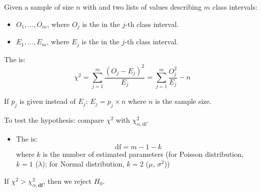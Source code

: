 \clearpage

\begin{multicols}{2}


  \par Given a sample of size $n$ with  and two lists of values describing  $m$ class intervals:
    \begin{itemize}
      \item $O_1, \ldots, O_m$, where $O_j$ is the  in the $j$-th class interval.
      \item $E_1, \ldots, E_m$, where $E_j$ is the  in the $j$-th class interval.
    \end{itemize}

  \par The  is:
    \[
      \chi^2 = \sum\limits_{j = 1}^{m} \frac{(O_j - E_j)^2}{E_j}
             = \sum\limits_{j = 1}^{m} \frac{O_j^2}{E_j} - n
    \]
  
  \par If $p_j$ is given instead of $E_j$: $E_j = p_j \times n$ where $n$ is the sample size.

  \par To test the hypothesis: compare $\chi^2$ with $\chi^2_{\alpha, \text{df}}$.
    \begin{itemize}
      \item The  is:
        \[
          \text{df} = m - 1 - k
        \]
        where $k$ is the number of estimated parameters (for Poisson distribution, $k = 1$ ($\lambda$); for Normal distribution, $k = 2$ ($\mu$, $\sigma^2$))
    \end{itemize}
  \par If $\chi^2 > \chi^2_{\alpha, \textbf{df}}$, then we reject $H_0$.



\end{multicols}
